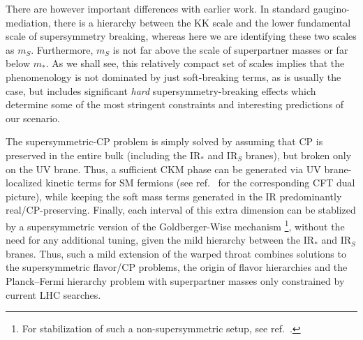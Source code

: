 \documentclass[a4paper,12pt]{article}
\begin{document}
There are however important differences with earlier work. In standard gaugino-mediation, there is a hierarchy between the KK scale and the lower fundamental scale of supersymmetry breaking, whereas here we are identifying these two scales as $m_S$.  Furthermore, $m_S$  is not far above the scale of superpartner masses or far below $m_*$. As we shall see, this relatively compact set of scales implies that the phenomenology is not dominated by just soft-breaking terms, as is usually the case, but includes significant {\it hard} supersymmetry-breaking effects which determine some of the most stringent constraints and interesting predictions of our scenario.


The 
supersymmetric-CP problem is simply solved by assuming that CP is preserved in the entire bulk (including the IR$_*$ and IR$_S$ branes), but broken only on the UV brane.
Thus, a sufficient 
CKM phase can be generated via UV brane-localized kinetic terms for SM fermions (see ref.~\cite{Frigerio:2018uwx} for the corresponding CFT dual picture), while keeping the soft mass terms generated in the IR predominantly real/CP-preserving.
Finally, each interval of this extra dimension can be stablized by a supersymmetric version of the Goldberger-Wise mechanism \cite{Son:2008mk}\footnote{For stabilization of such a non-supersymmetric setup, see ref.~\cite{Lee:2021wau}.}, without the need for any additional tuning, given the mild hierarchy between the IR$_*$ and IR$_S$ branes.
Thus, such a mild extension of the warped throat combines solutions to the supersymmetric flavor/CP problems, the origin of flavor hierarchies and the Planck--Fermi hierarchy problem with superpartner masses only constrained by current LHC searches.
\end{document}
